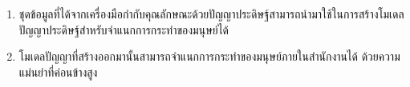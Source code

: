 \begin{enumerate}
	\item ชุดข้อมูลที่ได้จากเครื่องมือกำกับคุณลักษณะด้วยปัญญาประดิษฐ์สามารถนำมาใช้ในการสร้างโมเดลปัญญาประดิษฐ์สำหรับจำแนกการกระทำของมนุษย์ได้
	\item โมเดลปัญญาที่สร้างออกมานั้นสามารถจำแนกการกระทำของมนุษย์ภายในสำนักงานได้ ด้วยความแม่นยำที่ค่อนข้างสูง
\end{enumerate}